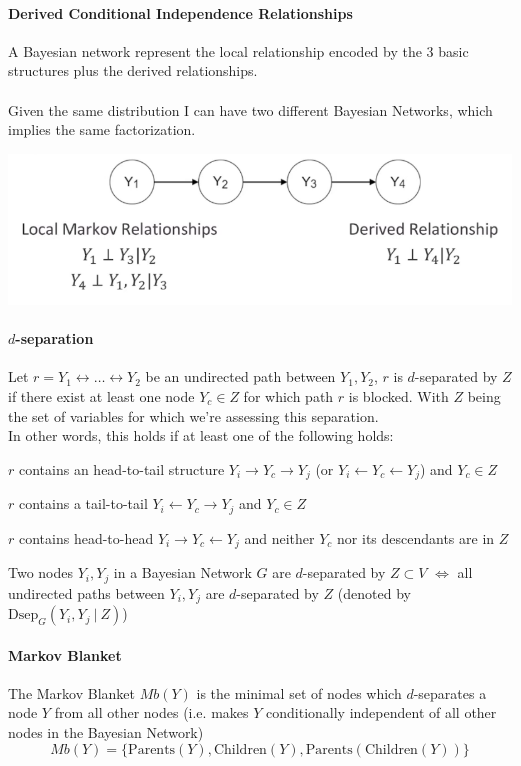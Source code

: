 \documentclass[10pt]{report}
\begin{document}
\paragraph{Derived Conditional Independence Relationships} A Bayesian network represent the local relationship encoded by the 3 basic structures plus the derived relationships.\\\\
Given the same distribution I can have two different Bayesian Networks, which implies the same factorization.
\begin{center}
	\includegraphics[scale=0.5]{23.png}
\end{center}
\paragraph{$d$-separation} Let $r = Y_1\leftrightarrow\ldots\leftrightarrow Y_2$ be an undirected path between $Y_1,Y_2$, $r$ is $d$-separated by $Z$ if there exist at least one node $Y_c\in Z$ for which path $r$ is blocked. With $Z$ being the set of variables for which we're assessing this separation.\\
In other words, this holds if at least one of the following holds:\begin{list}{}{}
	\item $r$ contains an head-to-tail structure $Y_i\rightarrow Y_c\rightarrow Y_j$ (or $Y_i\leftarrow Y_c\leftarrow Y_j$) and $Y_c \in Z$
	\item $r$ contains a tail-to-tail $Y_i\leftarrow Y_c\rightarrow Y_j$ and $Y_c \in Z$
	\item $r$ contains head-to-head $Y_i\rightarrow Y_c\leftarrow Y_j$ and neither $Y_c$ nor its descendants are in $Z$
\end{list}
Two nodes $Y_i,Y_j$ in a Bayesian Network $G$ are $d$-separated by $Z\subset V$ $\Leftrightarrow$ all undirected paths between $Y_i,Y_j$ are $d$-separated by $Z$ (denoted by $\text{Dsep}_G(Y_i,Y_j\:|\:Z)$)
\paragraph{Markov Blanket} The Markov Blanket $Mb(Y)$ is the minimal set of nodes which $d$-separates a node $Y$ from all other nodes (i.e. makes $Y$ conditionally independent of all other nodes in the Bayesian Network)
$$Mb(Y) = \{\text{Parents}(Y), \text{Children}(Y), \text{Parents}(\text{Children}(Y))\}$$
\end{document}
